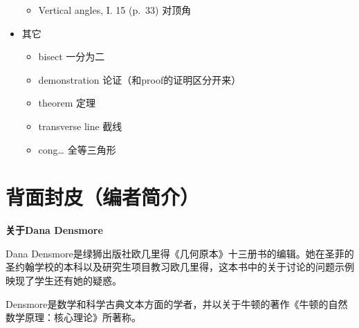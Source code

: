 \documentclass[
]{book}
\providecommand{\tightlist}{%
  \setlength{\itemsep}{0pt}\setlength{\parskip}{0pt}}
\begin{document}
\begin{itemize}
  \begin{itemize}
  \tightlist
  \item
    Vertical angles, I. 15 (p.~33) 对顶角
  \end{itemize}
\item
  其它

  \begin{itemize}
  \tightlist
  \item
    bisect 一分为二
  \item
    demonstration 论证（和proof的证明区分开来）
  \item
    theorem 定理
  \item
    transverse line 截线
  \item
    cong\ldots{} 全等三角形
  \end{itemize}
\end{itemize}

\hypertarget{ux80ccux9762ux5c01ux76aeux7f16ux8005ux7b80ux4ecb}{%
\chapter*{背面封皮（编者简介）}\label{ux80ccux9762ux5c01ux76aeux7f16ux8005ux7b80ux4ecb}}

\textbf{关于Dana Densmore}

Dana Densmore是绿狮出版社欧几里得《几何原本》十三册书的编辑。她在圣菲的圣约翰学校的本科以及研究生项目教习欧几里得，这本书中的关于讨论的问题示例映现了学生还有她的疑惑。

Densmore是数学和科学古典文本方面的学者，并以关于牛顿的著作《牛顿的自然数学原理：核心理论》所著称。

  
\end{document}
